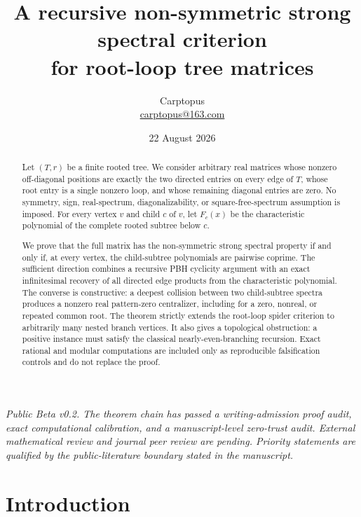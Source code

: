 \documentclass[11pt]{article}
\title{A recursive non-symmetric strong spectral criterion\\for root-loop tree matrices}
\author{Carptopus\\\href{mailto:carptopus@163.com}{carptopus@163.com}}
\date{22 August 2026}
\theoremstyle{remark}
\begin{document}
\maketitle

\begin{center}
\small\itshape
Public Beta v0.2. The theorem chain has passed a writing-admission
proof audit, exact computational calibration, and a manuscript-level zero-trust audit.
External mathematical review and journal peer review are pending. Priority statements
are qualified by the public-literature boundary stated in the manuscript.
\end{center}
\vspace{0.8em}

\begin{abstract}

Let $(T,r)$ be a finite rooted tree. We consider arbitrary real matrices whose nonzero off-diagonal positions are exactly the two directed entries on every edge of $T$, whose root entry is a single nonzero loop, and whose remaining diagonal entries are zero. No symmetry, sign, real-spectrum, diagonalizability, or square-free-spectrum assumption is imposed. For every vertex $v$ and child $c$ of $v$, let $F_c(x)$ be the characteristic polynomial of the complete rooted subtree below $c$.

We prove that the full matrix has the non-symmetric strong spectral property if and only if, at every vertex, the child-subtree polynomials are pairwise coprime. The sufficient direction combines a recursive PBH cyclicity argument with an exact infinitesimal recovery of all directed edge products from the characteristic polynomial. The converse is constructive: a deepest collision between two child-subtree spectra produces a nonzero real pattern-zero centralizer, including for a zero, nonreal, or repeated common root. The theorem strictly extends the root-loop spider criterion to arbitrarily many nested branch vertices. It also gives a topological obstruction: a positive instance must satisfy the classical nearly-even-branching recursion. Exact rational and modular computations are included only as reproducible falsification controls and do not replace the proof.

\end{abstract}

\section{Introduction}
\end{document}
